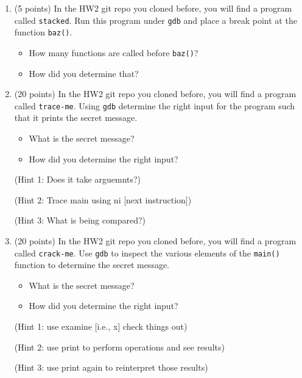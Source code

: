 \documentclass{article}[9pt]
\begin{document}
\begin{enumerate}
\item (5 points) In the HW2 git repo you cloned before, you will find a program
called \texttt{stacked}. Run this program under \texttt{gdb} and place a break
point at the function \texttt{baz()}.

\begin{itemize}
\item How many functions are called before \texttt{baz()}?
\item How did you determine that?
\end{itemize}

\item (20 points) In the HW2 git repo you cloned before, you will find a program
called \texttt{trace-me}. Using \texttt{gdb} determine the right input for
the program such that it prints the secret message.

\begin{itemize}
\item What is the secret message?
\item How did you determine the right input?
\end{itemize}

(Hint 1: Does it take arguemnts?)

(Hint 2: Trace main using ni [next instruction])

(Hint 3: What is being compared?)

\item (20 points) In the HW2 git repo you cloned before, you will find a program
called \texttt{crack-me}. Use \texttt{gdb} to inspect the various elements of
the \texttt{main()} function to determine the secret message.

\begin{itemize}
\item What is the secret message?
\item How did you determine the right input?
\end{itemize}

(Hint 1: use examine [i.e., x] check things out)

(Hint 2: use print to perform operations and see results)

(Hint 3: use print again to reinterpret those results)
\end{enumerate}
\end{document}
